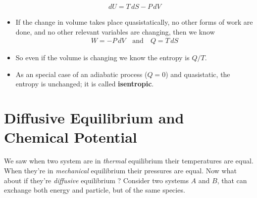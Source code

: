 \documentclass{book}
\begin{document}
\begin{itemize}
\begin{align}
		      dU = T \, dS - P \, dV
	      \end{align}
	\item If the change in volume takes place quasistatically, no other forms of work are done, and no other relevant
	      variables are changing, then we know
	      \begin{align}
		      W = -P \, dV \quad \text{and} \quad
		      Q = T \, dS
	      \end{align}
	\item So even if the volume is changing we know the entropy is $ Q/T $.
	\item As an special case of an adiabatic process ($ Q=0 $) and quasistatic, the entropy is unchanged; it is called
	      \textbf{isentropic}.
\end{itemize}


\section{Diffusive Equilibrium and Chemical Potential}%
\label{sec:diffusive equi}

We saw when two system are in \textit{thermal} equilibrium their temperatures are equal.
When they're in \textit{mechanical} equilibrium their pressures are equal.
Now what about if they're \textit{diffusive} equilibrium ?
Consider two systems $ A $ and $ B $, that can exchange both energy and particle, but of the same species.
\end{document}
